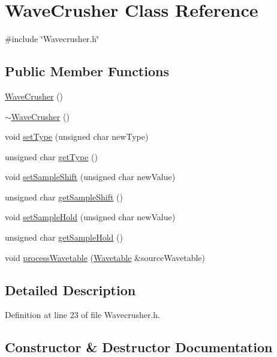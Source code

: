 \hypertarget{class_wave_crusher}{}\section{Wave\+Crusher Class Reference}
\label{class_wave_crusher}


{\ttfamily \#include \char`\"{}Wavecrusher.\+h\char`\"{}}

\subsection*{Public Member Functions}
\begin{DoxyCompactItemize}
\item 
\hyperlink{class_wave_crusher_a3e0ce1e58ad9fe4ab8a18fb6ecdb0db2}{Wave\+Crusher} ()
\item 
\hyperlink{class_wave_crusher_a464c498c7a7219aa92ba30b3951dc282}{$\sim$\+Wave\+Crusher} ()
\item 
void \hyperlink{class_wave_crusher_a61ba1c5b0cf0c3bd1f112de317f2deb3}{set\+Type} (unsigned char new\+Type)
\item 
unsigned char \hyperlink{class_wave_crusher_a2bb40dc158e5e3358b632572ba2eb7c3}{get\+Type} ()
\item 
void \hyperlink{class_wave_crusher_a94b87729fc0b2930b98e8c5fb9ed2631}{set\+Sample\+Shift} (unsigned char new\+Value)
\item 
unsigned char \hyperlink{class_wave_crusher_a08b705c5bb1c1c4a22d8265f2992a0bd}{get\+Sample\+Shift} ()
\item 
void \hyperlink{class_wave_crusher_aa3df1e5da9635cf84a59e4d481bf208b}{set\+Sample\+Hold} (unsigned char new\+Value)
\item 
unsigned char \hyperlink{class_wave_crusher_a084b8413b14c16e4cab7f65caf9e3fd0}{get\+Sample\+Hold} ()
\item 
void \hyperlink{class_wave_crusher_a906f0056db9847e6fafd406ab9e613a9}{process\+Wavetable} (\hyperlink{class_wavetable}{Wavetable} \&source\+Wavetable)
\end{DoxyCompactItemize}


\subsection{Detailed Description}


Definition at line 23 of file Wavecrusher.\+h.



\subsection{Constructor \& Destructor Documentation}
\mbox{\label{class_wave_crusher_a3e0ce1e58ad9fe4ab8a18fb6ecdb0db2}} 
